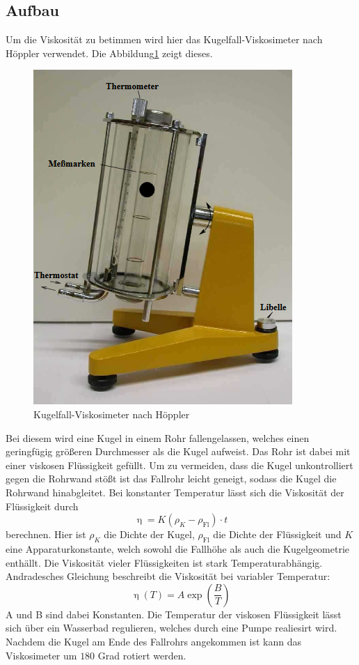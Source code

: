 \subsection{Aufbau}
Um die Viskosität zu betimmen wird hier das Kugelfall-Viskosimeter nach Höppler verwendet.
Die Abbildung\ref{fig:aufbau} zeigt dieses.
\begin{figure}[H]
  \centering
  \includegraphics{content/Aufbau.png}
  \caption{Kugelfall-Viskosimeter nach Höppler\cite{v107}}
  \label{fig:aufbau}
\end{figure}
Bei diesem wird eine Kugel in einem Rohr fallengelassen, welches einen geringfügig größeren Durchmesser als die Kugel aufweist.
Das Rohr ist dabei mit einer viskosen Flüssigkeit gefüllt.
Um zu vermeiden, dass die Kugel unkontrolliert gegen die Rohrwand stößt ist das Fallrohr leicht geneigt, sodass die Kugel die Rohrwand hinabgleitet.
Bei konstanter Temperatur lässt sich die Viskosität der Flüssigkeit durch
\begin{equation}
  \upeta = K (\rho_K -\rho_\text{Fl}) \cdot t
\end{equation}
 berechnen.
Hier ist $\rho_K$ die Dichte der Kugel, $\rho_\text{Fl}$ die Dichte der Flüssigkeit und $K$ eine Apparaturkonstante, welch sowohl die Fallhöhe als auch die Kugelgeometrie enthällt.
Die Viskosität vieler Flüssigkeiten ist stark Temperaturabhängig.
Andradesches Gleichung beschreibt die Viskosität bei variabler Temperatur:
\begin{equation}
  \label{eq:and}
  \upeta (T)= A \exp(\frac{B}{T})
\end{equation}
A und B sind dabei Konstanten.
Die Temperatur der viskosen Flüssigkeit lässt sich über ein Wasserbad regulieren, welches durch eine Pumpe realiesirt wird.
Nachdem die Kugel am Ende des Fallrohrs angekommen ist kann das Viskosimeter um $180$ Grad rotiert werden.

